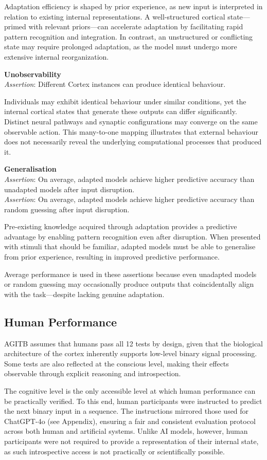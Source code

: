 \documentclass{article}
\newcommand{\agitbtest}[2]{
  \item
  \begin{minipage}[t]{\linewidth}
    \textbf{#1} \\[0.5ex]
    #2
  \end{minipage}
}
\begin{document}
\begin{agitblist}
{Adaptation efficiency is shaped by prior experience, as new input is interpreted in relation to existing internal representations. A well-structured cortical state—primed with relevant priors—can accelerate adaptation by facilitating rapid pattern recognition and integration. In contrast, an unstructured or conflicting state may require prolonged adaptation, as the model must undergo more extensive internal reorganization.
}
\agitbtest{Unobservability}{
\emph{Assertion}: Different Cortex instances can produce identical behaviour.

Individuals may exhibit identical behaviour under similar conditions, yet the internal cortical states that generate these outputs can differ significantly. Distinct neural pathways and synaptic configurations may converge on the same observable action. This many-to-one mapping illustrates that external behaviour does not necessarily reveal the underlying computational processes that produced it.
}
\agitbtest{Generalisation}{
\emph{Assertion}: On average, adapted models achieve higher predictive accuracy than unadapted models after input disruption.\\
\emph{Assertion}: On average, adapted models achieve higher predictive accuracy than random guessing after input disruption.

Pre-existing knowledge acquired through adaptation provides a predictive advantage by enabling pattern recognition even after disruption. When presented with stimuli that should be familiar, adapted models must be able to generalise from prior experience, resulting in improved predictive performance.

Average performance is used in these assertions because even unadapted models or random guessing may occasionally produce outputs that coincidentally align with the task—despite lacking genuine adaptation.
}

\end{agitblist}

\subsection{Human Performance}

AGITB assumes that humans pass all 12 tests by design, given that the biological architecture of the cortex inherently supports low-level binary signal processing. Some tests are also reflected at the conscious level, making their effects observable through explicit reasoning and introspection.

The cognitive level is the only accessible level at which human performance can be practically verified. To this end, human participants were instructed to predict the next binary input in a sequence. The instructions mirrored those used for ChatGPT-4o (see Appendix), ensuring a fair and consistent evaluation protocol across both human and artificial systems. Unlike AI models, however, human participants were not required to provide a representation of their internal state, as such introspective access is not practically or scientifically possible.
\end{document}
